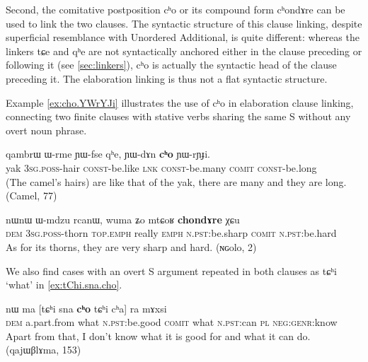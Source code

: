 \documentclass[oldfontcommands,oneside,a4paper,11pt]{article}
\newcommand{\ipa}[1]{{\phon \mbox{#1}}} %
\begin{document}
Second,  the comitative postposition \ipa{cʰo} or its compound form  \ipa{cʰondɤre} can be used to link the two clauses. The syntactic structure of this clause linking, despite superficial resemblance with Unordered Additional, is quite different: whereas the linkers \ipa{tɕe} and \ipa{qʰe} are not syntactically anchored either in the clause preceding or following it (see \ref{sec:linkers}), \ipa{cʰo} is actually the syntactic head of the clause preceding it. The elaboration linking is thus not a flat syntactic structure.



Example \ref{ex:cho.YWrYJi} illustrates the use of \ipa{cʰo} in elaboration clause linking, connecting two finite clauses with stative verbs sharing the same S without any overt noun phrase.

\begin{exe}
\ex \label{ex:cho.YWrYJi}
\gll
\ipa{qambrɯ}  	\ipa{ɯ-rme}  	\ipa{ɲɯ-fse}  	\ipa{qʰe,}  	\ipa{ɲɯ-dɤn}  	\ipa{\textbf{cʰo}}  	\ipa{ɲɯ-rɲɟi.}  \\
yak \textsc{3sg.poss}-hair \textsc{const}-be.like \textsc{lnk} \textsc{const}-be.many \textsc{comit} \textsc{const}-be.long \\
\glt (The camel's hairs) are like that of the yak, there are many and they are long. (Camel, 77)
\end{exe}

\begin{exe}
\ex \label{ex:chondAre}
\gll
\ipa{nɯnɯ}  	\ipa{ɯ-mdzu}  	\ipa{rcanɯ,}  	\ipa{wuma}  	\ipa{ʑo}  	\ipa{mtɕoʁ}  	\ipa{\textbf{chondɤre}}  	\ipa{χɕu}  \\
\textsc{dem} \textsc{3sg.poss}-thorn \textsc{top.emph} really \textsc{emph} \textsc{n.pst}:be.sharp \textsc{comit} \textsc{n.pst}:be.hard \\
\glt As for its thorns, they are very sharp and hard. (ɴɢolo, 2)
\end{exe}

We also find cases with an overt S argument repeated in both clauses as \ipa{tɕʰi} `what' in \ref{ex:tChi.sna.cho}.

\begin{exe}
\ex \label{ex:tChi.sna.cho}
\gll
\ipa{nɯ}  	\ipa{ma}  	[\ipa{tɕʰi}  	\ipa{sna}  	\ipa{\textbf{cʰo}}  	\ipa{tɕʰi}  	\ipa{cʰa}]  	\ipa{ra}  	\ipa{mɤxsi}  \\
\textsc{dem} a.part.from what \textsc{n.pst}:be.good \textsc{comit} what \textsc{n.pst}:can \textsc{pl} \textsc{neg:genr}:know\\
\glt Apart from that, I don't know what it is good for and what it can do. (qajɯβlɤma, 153)
\end{exe}
\end{document}
